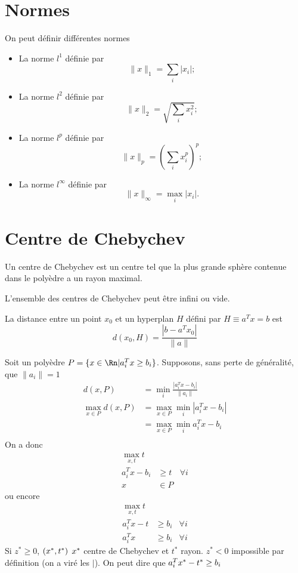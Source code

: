 \section{Normes}
On peut définir différentes normes
\begin{itemize}
  \item La norme $l^1$ définie par
    \[ \|x\|_1 = \sum_i |x_i|; \]
  \item La norme $l^2$ définie par
    \[ \|x\|_2 = \sqrt{\sum_i x_i^2}; \]
  \item La norme $l^p$ définie par
    \[ \|x\|_p = \left(\sum_i x_i^p\right)^p; \]
  \item La norme $l^\infty$ définie par
    \[ \|x\|_\infty = \max_i |x_i|. \]
\end{itemize}

\section{Centre de Chebychev}
\begin{mydef}
  Un centre de Chebychev est un centre tel que la plus grande sphère
  contenue dans le polyèdre a un rayon maximal.
\end{mydef}
\begin{myrem}
  L'ensemble des centres de Chebychev peut être infini ou vide.
\end{myrem}
\begin{myprop}
  La distance entre un point $x_0$ et
  un hyperplan $H$ défini par $H\equiv a^Tx = b$ est
  \[ d(x_0, H) = \frac{|b-a^Tx_0|}{\|a\|} \]
\end{myprop}

Soit un polyèdre $P = \{x\in\Rn|a_i^Tx \geq b_i\}$.
Supposons, sans perte de généralité, que $\|a_i\| = 1$
\begin{align*}
  d(x, P) & = \min_i \frac{|a_i^Tx - b_i|}{\|a_i\|}\\
  \max_{x\in P} d(x, P)
  & = \max_{x\in P}\min_i |a_i^Tx - b_i|\\
  & = \max_{x\in P}\min_i a_i^Tx - b_i\\
\end{align*}
On a donc
\begin{align*}
  \max_{x, t} t\\
  a_i^Tx - b_i & \geq t & \forall i\\
  x & \in P
\end{align*}
ou encore
\begin{align*}
  \max_{x, t} t\\
  a_i^Tx - t & \geq b_i & \forall i\\
  a_i^Tx & \geq b_i & \forall i %
\end{align*}
Si $z^* \geq 0$, $(x^*, t^*)$
$x^*$ centre de Chebychev et $t^*$ rayon.
$z^* < 0$ impossible par définition (on a viré les $|$).
On peut dire que $a_i^Tx^* -t^* \geq b_i$

